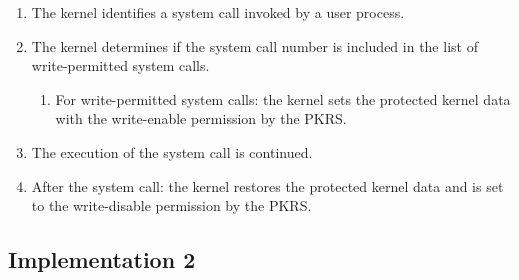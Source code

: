 \begin{enumerate}%
\item The kernel identifies a system call invoked by a user process.
  
  
\item The kernel determines if the system call number is included in the list of write-permitted system calls.

\begin{enumerate}%
\item For write-permitted system calls: the kernel sets the protected kernel data with
the write-enable permission by the PKRS.
\end{enumerate}
  
\item The execution of the system call is continued.
\item After the system call: the kernel restores the protected kernel data and
is set to the write-disable permission by the PKRS.

\end{enumerate}


\subsection{Implementation 2} \label{subsection:imp02_write_handling}

